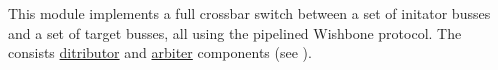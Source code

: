 This module implements a full crossbar switch between a set of initator
busses and a set of target busses, all using the pipelined Wishbone    
protocol. The  consists \hyperref[dist]{ditributor} and
\hyperref[arb]{arbiter} components (see ).                                                              
